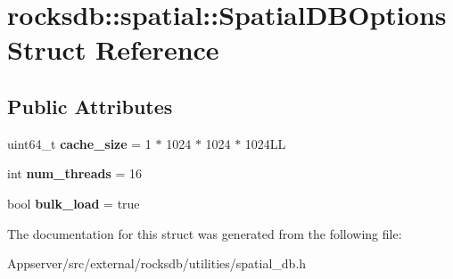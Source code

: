 \hypertarget{structrocksdb_1_1spatial_1_1SpatialDBOptions}{}\section{rocksdb\+:\+:spatial\+:\+:Spatial\+D\+B\+Options Struct Reference}
\label{structrocksdb_1_1spatial_1_1SpatialDBOptions}
\subsection*{Public Attributes}
\begin{DoxyCompactItemize}
\item 
uint64\+\_\+t {\bfseries cache\+\_\+size} = 1 $\ast$ 1024 $\ast$ 1024 $\ast$ 1024\+LL\hypertarget{structrocksdb_1_1spatial_1_1SpatialDBOptions_af4513069289bb4a6df704398f0580c18}{}\label{structrocksdb_1_1spatial_1_1SpatialDBOptions_af4513069289bb4a6df704398f0580c18}

\item 
int {\bfseries num\+\_\+threads} = 16\hypertarget{structrocksdb_1_1spatial_1_1SpatialDBOptions_a606fd50516e4ccb5c722d232e50d1ce5}{}\label{structrocksdb_1_1spatial_1_1SpatialDBOptions_a606fd50516e4ccb5c722d232e50d1ce5}

\item 
bool {\bfseries bulk\+\_\+load} = true\hypertarget{structrocksdb_1_1spatial_1_1SpatialDBOptions_ad81ef89039b815d3d585c7d454b89044}{}\label{structrocksdb_1_1spatial_1_1SpatialDBOptions_ad81ef89039b815d3d585c7d454b89044}

\end{DoxyCompactItemize}


The documentation for this struct was generated from the following file\+:\begin{DoxyCompactItemize}
\item 
Appserver/src/external/rocksdb/utilities/spatial\+\_\+db.\+h\end{DoxyCompactItemize}
